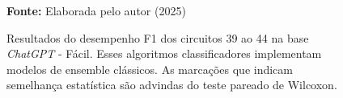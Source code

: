 \begin{figure}
\caption{Resultados do desempenho F1 dos circuitos 39 ao 44 na base \textit{ChatGPT} - Fácil. Esses algoritmos classificadores implementam modelos de ensemble clássicos. As marcações que indicam semelhança estatística são advindas do teste pareado de Wilcoxon.}
\label{fig:f1:easy:g8}
     \centering
    \centering

      \par\medskip\ABNTEXfontereduzida\selectfont\textbf{Fonte:} Elaborada pelo autor (2025) \par\medskip
\end{figure}